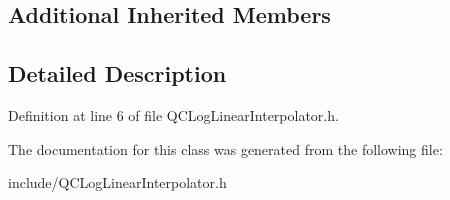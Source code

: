 \subsection*{Additional Inherited Members}


\subsection{Detailed Description}


Definition at line 6 of file Q\+C\+Log\+Linear\+Interpolator.\+h.



The documentation for this class was generated from the following file\+:\begin{DoxyCompactItemize}
\item 
include/Q\+C\+Log\+Linear\+Interpolator.\+h\end{DoxyCompactItemize}
